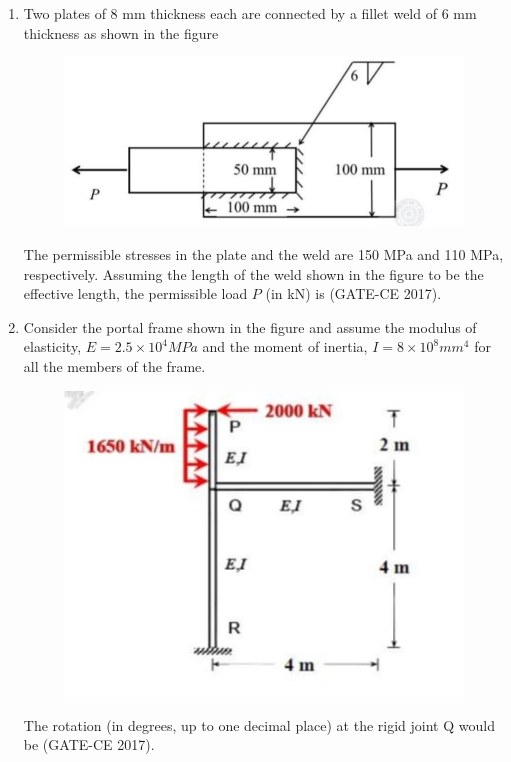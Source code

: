 \documentclass[journal,12pt,onecolumn]{article}
\theoremstyle{remark}
\begin{document}
\begin{enumerate}
    \item Two plates of 8 mm thickness each are connected by a fillet weld of 6 mm thickness as shown in the figure 
    \begin{figure}[H]
    \centering
    \includegraphics[width=0.7\columnwidth]{figs/q41.jpg}  
    \caption{}
    \label{fig:11}
    \end{figure}
    The permissible stresses in the plate and the weld are 150 MPa and 110 MPa, respectively. Assuming the length of the weld shown in the figure to be the effective length, the permissible load $ P $ (in kN) is \underline{\hspace{3cm}} \hfill (GATE-CE 2017).

    \item Consider the portal frame shown in the figure  and assume the modulus of elasticity, $ E = 2.5 \times 10^4 MPa $ and the moment of inertia, $ I = 8 \times 10^8 mm^4 $ for all the members of the frame.
    \begin{figure}[H]
    \centering
    \includegraphics[width=0.7\columnwidth]{figs/q42.jpg}  
    \caption{}
    \label{fig:11}
    \end{figure}
    The rotation (in degrees, up to one decimal place) at the rigid joint Q would be \underline{\hspace{3cm}} \hfill (GATE-CE 2017).


\end{enumerate}
\end{document}
